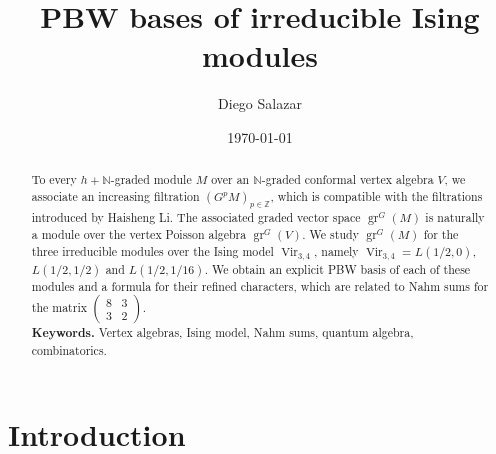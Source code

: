 \documentclass[a4paper, 12pt, reqno]{amsart}
\theoremstyle{remark}
\DeclareMathOperator{\Vir}{Vir}
\DeclareMathOperator{\gr}{gr}
\begin{document}
\setcounter{section}{-1}

\begin{abstract}
  To every $h + \mathbb{N}$-graded module $M$ over an $\mathbb{N}$-graded conformal vertex algebra $V$, we associate an increasing filtration $(G^pM)_{p \in \mathbb{Z}}$, which is compatible with the filtrations introduced by Haisheng Li.
  The associated graded vector space $\gr^G(M)$ is naturally a module over the vertex Poisson algebra $\gr^G(V)$.
  We study $\gr^G(M)$ for the three irreducible modules over the Ising model $\Vir_{3, 4}$, namely $\Vir_{3, 4} = L(1/2, 0)$, $L(1/2, 1/2)$ and $L(1/2, 1/16)$.
  We obtain an explicit PBW basis of each of these modules and a formula for their refined characters, which are related to Nahm sums for the matrix $\left(\begin{smallmatrix} 8 & 3 \\ 3 & 2 \end{smallmatrix}\right)$. \\
  \smallskip
  \noindent \textbf{Keywords.} Vertex algebras, Ising model, Nahm sums, quantum algebra, combinatorics.
\end{abstract}

\title{PBW bases of irreducible Ising modules}
\author{Diego Salazar}
\address{Instituto de Matemática Pura e Aplicada, Rio de Janeiro, RJ, Brazil}
\date{\today}
\maketitle

\vspace{-1em}
\tableofcontents

\section{Introduction}
\label{sec:introduction}
\end{document}
